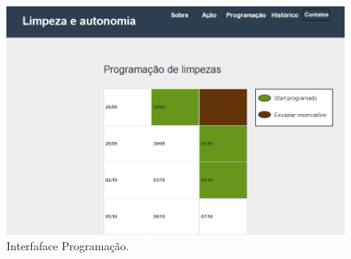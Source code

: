 \begin{figure}[H]                                    
  \centering                                         
  \includegraphics[scale=0.4]{figuras/programacao.png}
  \caption{Interfaface Programação.}                        
  \label{img:inter_programacao}                              
\end{figure}

